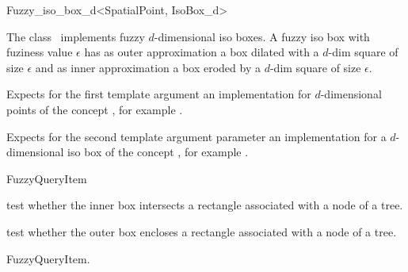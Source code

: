 

\begin{ccRefClass}{Fuzzy_iso_box_d<SpatialPoint, IsoBox_d>}  %


\ccDefinition
  
The class \ccRefName\ implements fuzzy $d$-dimensional iso boxes.
A fuzzy iso box with fuziness value $\epsilon$ has
as outer approximation a box  dilated with a $d$-dim square of size $\epsilon$ and
as inner approximation a box eroded by a $d$-dim square of size $\epsilon$. 


\ccParameters
Expects for the first template argument
an implementation for $d$-dimensional points
of the concept ,
for example .

Expects for the second template argument parameter  an implementation for a $d$-dimensional iso box
of the concept ,
for example .
 
\ccIsModel

FuzzyQueryItem

\ccTypes


\ccCreation
{}  %


\ccOperations


{test whether the inner box intersects a rectangle
associated with a node of a tree.}

{test whether the outer box encloses a rectangle
associated with a node of a tree.}

\ccSeeAlso

FuzzyQueryItem.

\end{ccRefClass}


